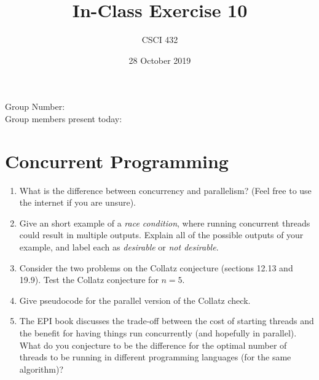 \documentclass{article}
\title{In-Class Exercise 10}
\author{CSCI 432}
\date{28 October 2019}
\begin{document}
\maketitle

\noindent
Group Number:\\
Group members present today:

\section*{Concurrent Programming}

\begin{enumerate}
    \item What is the difference between concurrency and parallelism? (Feel
        free to use the internet if you are unsure).
        \vspace{1in}

    \item Give an short example of a \emph{race condition},
        where running concurrent
        threads could result in multiple outputs.  Explain all of the possible
        outputs of your example, and label each as \emph{desirable} or \emph{not
        desirable}.
        \vspace{3in}

    \item Consider the two problems on the Collatz conjecture (sections 12.13
        and 19.9).  Test the Collatz conjecture for $n=5$.
        \vspace{1in}

    \item Give pseudocode for the parallel version of the Collatz check.
        \vspace{3in}

    \item The EPI book discusses the trade-off between the cost of starting
        threads and the benefit for having things run concurrently (and
        hopefully in parallel).  What do you conjecture to be the difference for
        the optimal number of threads to be running in different programming
        languages (for the same algorithm)?
\end{enumerate}
\end{document}
